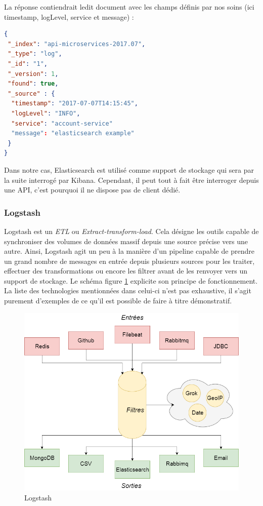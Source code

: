 	La réponse contiendrait ledit document avec les champs définis par nos soins (ici timestamp, logLevel, service et message) :
	
\begin{lstlisting}[language=json]
{
 "_index": "api-microservices-2017.07",
 "_type": "log",
 "_id": "1",
 "_version": 1,
 "found": true,
 "_source" : {
  "timestamp": "2017-07-07T14:15:45",
  "logLevel": "INFO",
  "service": "account-service"
  "message": "elasticsearch example"
 }
}
	\end{lstlisting}
	 
	 Dans notre cas, Elasticsearch est utilisé comme support de stockage qui sera par la suite interrogé par Kibana. Cependant, il peut tout à fait être interroger depuis une API, c'est pourquoi il ne dispose pas de client dédié.
	
	\subsubsection{Logstash}
	Logstash est un \textit{ETL} ou \textit{Extract-transform-load}. Cela désigne les outils capable de synchroniser des volumes de données massif depuis une source précise vers une autre. Ainsi, Logstash agit un peu à la manière d'un pipeline capable de prendre un grand nombre de messages en entrée depuis plusieurs sources pour les traiter, effectuer des transformations ou encore les filtrer avant de les renvoyer vers un support de stockage. Le schéma figure \ref{logstash} explicite son principe de fonctionnement. La liste des technologies mentionnées dans celui-ci n'est pas exhaustive, il s'agit purement d'exemples de ce qu'il est possible de faire à titre démonstratif. \\
	
	\begin{figure}[h!]
		\includegraphics[scale=0.4]{images/travailNeuflizeOBC/dashboard/logstash.png}
		\centering
		\caption{Logstash}
		\label{logstash}
	\end{figure}
	
